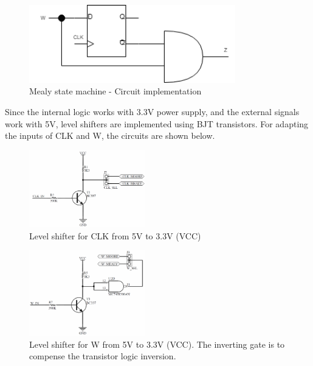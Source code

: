 \begin{figure}[H]
    \begin{centering}
    \includegraphics[width=0.8\textwidth]{Graficos3/3b_Compuertas_Mealy.png}
    \par\end{centering}
    \caption{Mealy state machine - Circuit implementation}
\end{figure}

\newpage
Since the internal logic works with 3.3V power supply, 
and the external signals work with 5V, level shifters 
are implemented using BJT transistors. For adapting
the inputs of CLK and W, the circuits are shown 
below. 

\begin{figure}[H]
    \begin{centering}
    \includegraphics[width=0.45\textwidth]{Graficos3/CLK_Driver.png}
    \par\end{centering}
    \caption{Level shifter for CLK from 5V to 3.3V (VCC)}
\end{figure}

\begin{figure}[H]
    \begin{centering}
    \includegraphics[width=0.45\textwidth]{Graficos3/W_Driver.png}
    \par\end{centering}
    \caption{Level shifter for W from 5V to 3.3V (VCC). The inverting gate is to compense the transistor logic inversion.}
\end{figure}

